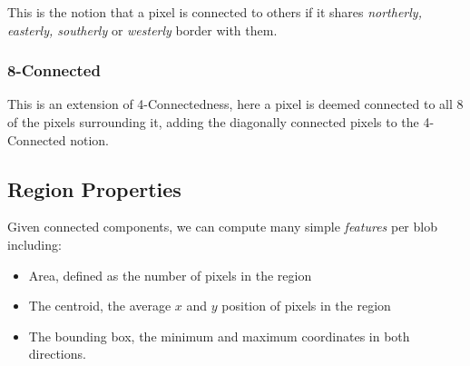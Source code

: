 \documentclass{article}
\begin{document}
This is the notion that a pixel is connected to others if it shares \textit{northerly, easterly, southerly} or \textit{westerly} border with them.

\subsubsection{8-Connected}

This is an extension of 4-Connectedness, here a pixel is deemed connected to all 8 of the pixels surrounding it, adding the diagonally connected pixels to the 4-Connected notion.


\subsection{Region Properties}

Given connected components, we can compute many simple \textit{features} per blob including:

\begin{itemize}
  \item Area, defined as the number of pixels in the region
  \item The centroid, the average $x$ and $y$ position of pixels in the region
  \item The bounding box, the minimum and maximum coordinates in both directions.
\end{itemize}
\end{document}
